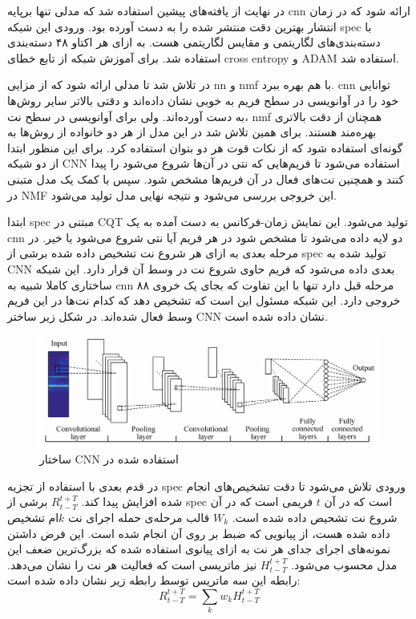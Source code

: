 در نهایت از یافته‌های پیشین استفاده شد که مدلی تنها برپایه \gls{cnn} ارائه شود
که در زمان انتشار بهترین دقت منتشر شده را به دست آورده بود. ورودی این شبکه
\gls{spec} با دسته‌بندی‌های لگاریتمی و مقایس لگاریتمی هست. به ازای هر اکتاو ۴۸
دسته‌بندی استفاده شد. برای آموزش شبکه از تابع خطای \gls{cross entropy} و ADAM
استفاده شد.

در \cite{wang2017two} تلاش شد تا مدلی ارائه شود که از مزایی \gls{nn} و \gls{nmf}
با هم بهره ببرد. \gls{cnn} توانایی خود را در آوانویسی در سطح فریم به خوبی نشان
داده‌اند و دقتی بالاتر سایر روش‌ها به دست آورده‌اند. ولی برای آوانویسی در سطح
نت، \gls{nmf} همچنان از دقت بالاتری بهره‌مند هستند. برای همین تلاش شد در این مدل
از هر دو خانواده از روش‌ها به گونه‌ای استفاده شود که از نکات قوت هر دو بتوان
استفاده کرد. برای این منظور ابتدا از دو شبکه \gls{CNN} استفاده می‌شود تا
فریم‌هایی که نتی در آن‌ها شروع می‌شود را پیدا کنند و همچنین نت‌های فعال در آن
فریم‌ها مشخص شود. سپس با کمک یک مدل متبنی در \gls{NMF} این خروجی بررسی می‌شود و
نتیجه نهایی مدل تولید می‌شود.

ابتدا \gls{spec} مبتنی در \gls{CQT} تولید می‌شود. این نمایش زمان-فرکانس به دست
آمده به یک \gls{cnn} دو لایه داده می‌شود تا مشخص شود در هر فریم آیا نتی شروع
می‌شود یا خیر. در مرحله بعدی به ازای هر شروع نت تشخیص داده شده برشی از
\gls{spec} تولید شده به \gls{CNN} بعدی داده می‌شود که فریم حاوی شروع نت در وسط آن
قرار دارد. این شبکه ساختاری کاملا شبیه به \gls{cnn} مرحله قبل دارد تنها با این
تفاوت که بجای یک خروی ۸۸ خروجی دارد. این شبکه مسئول این است که تشخیص دهد که کدام
نت‌ها در این فریم وسط فعال شده‌اند. در شکل زیر ساختر \gls{CNN} نشان داده شده است.
\begin{figure}[ht]
    \centering
    \includegraphics[width=12cm]{./statics/wang2017two_cnn.png}
    \caption{ساختار \gls{CNN} استفاده شده در \cite{wang2017two}}
\end{figure}

در قدم بعدی با استفاده از تجزیه \gls{spec} ورودی تلاش می‌شود تا دقت تشخیص‌های
انجام شده افزایش پیدا کند. $R_{t - T}^{t + T}$ برشی از \gls{spec} است که در آن
$t$ فریمی است که در آن شروع نت تشحیص داده شده است. $W_k$ قالب مرحله‌ی حمله اجرای
نت $k$ام تشخیص داده شده هست، از پیانویی که ضبط بر روی آن انجام شده است. این فرض
داشتن نمونه‌های اجرای جدای هر نت به ازای پیانوی استفاده شده که بزرگ‌ترین ضعف این
مدل محسوب می‌شود. $H_{t - T}^{t + T}$ نیز ماتریسی‌ است که فعالیت هر نت را نشان
می‌دهد. رابطه این سه ماتریس توسط رابطه زیر نشان داده شده است:
\begin{equation}
    R_{t - T}^{t + T} = \sum_{k} w_k H_{t - T}^{t + T}
\end{equation}

